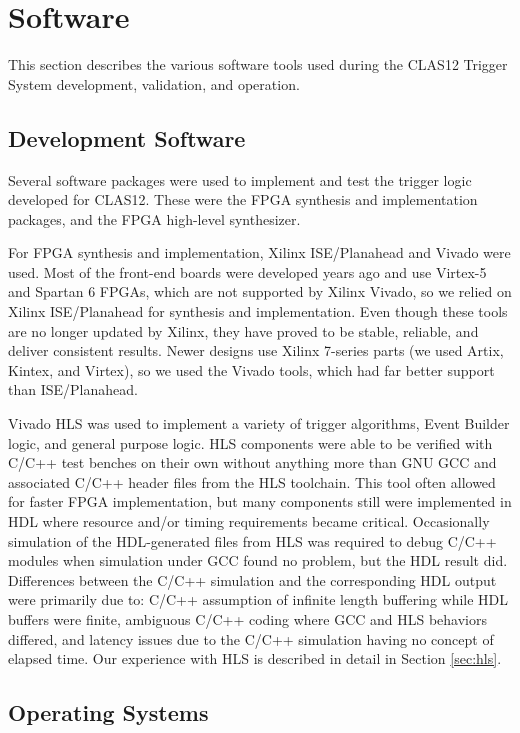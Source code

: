 \section{Software}

This section describes the various software tools used during the CLAS12 Trigger System development,
validation, and operation.

\subsection{Development Software}

Several software packages were used to implement and test the trigger logic developed for CLAS12. These
were the FPGA synthesis and implementation packages, and the FPGA high-level synthesizer.

For FPGA synthesis and implementation, Xilinx ISE/Planahead and Vivado were used. Most of the front-end
boards were developed years ago and use Virtex-5 and Spartan 6 FPGAs, which are not supported by Xilinx
Vivado, so we relied on Xilinx ISE/Planahead for synthesis and implementation. Even though these tools are no
longer updated by Xilinx, they have proved to be stable, reliable, and deliver consistent results. Newer designs
use Xilinx 7-series parts (we used Artix, Kintex, and Virtex), so we used the Vivado tools, which had far better
support than ISE/Planahead.

Vivado HLS was used to implement a variety of trigger algorithms, Event Builder logic, and general purpose
logic. HLS components were able to be verified with C/C++ test benches on their own without anything more
than GNU GCC and associated C/C++ header files from the HLS toolchain. This tool often allowed for faster
FPGA implementation, but many components still were implemented in HDL where resource and/or timing
requirements became critical. Occasionally simulation of the HDL-generated files from HLS was required
to debug C/C++ modules when simulation under GCC found no problem, but the HDL result did. Differences
between the C/C++ simulation and the corresponding HDL output were primarily due to: C/C++ assumption of
infinite length buffering while HDL buffers were finite, ambiguous C/C++ coding where GCC and HLS behaviors
differed, and latency issues due to the C/C++ simulation having no concept of elapsed time. Our experience with
HLS is described in detail in Section \ref{sec:hls}.

\subsection{Operating Systems}

